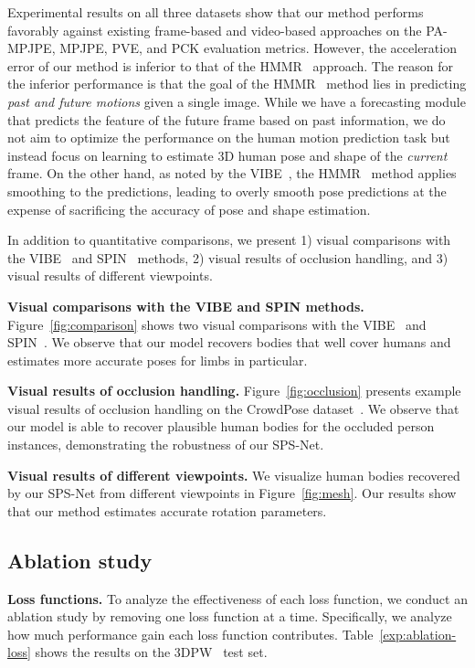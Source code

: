 \documentclass[times,referee,twocolumn,final,authoryear]{elsarticle}
\newcommand{\revised}[1]{{{#1}}}
\newcommand{\heading}[1]{\noindent\textbf{#1}}
\begin{document}
Experimental results on all three datasets show that our method performs favorably against existing frame-based and video-based approaches on the PA-MPJPE, MPJPE, PVE, and PCK evaluation metrics.
However, the acceleration error of our method is inferior to that of the HMMR~\citep{TemporalHMR} approach.
The reason for the inferior performance is that the goal of the HMMR~\citep{TemporalHMR} method lies in predicting \emph{past and future motions} given a single image.
While we have a forecasting module  that predicts the feature of the future frame based on past information, we do not aim to optimize the performance on the human motion prediction task but instead focus on learning to estimate 3D human pose and shape of the \emph{current} frame.
On the other hand, as noted by the VIBE~\citep{VIBE}, the HMMR~\citep{TemporalHMR} method applies smoothing to the predictions, leading to overly smooth pose predictions at the expense of sacrificing the accuracy of pose and shape estimation.

In addition to quantitative comparisons, we present 1) visual comparisons with the VIBE~\citep{VIBE} and SPIN~\citep{SPIN} methods, 2) visual results of occlusion handling, and 3) visual results of different viewpoints.

\heading{Visual comparisons with the VIBE and SPIN methods.}
Figure~\ref{fig:comparison} shows two visual comparisons with the VIBE~\citep{VIBE} and SPIN~\citep{SPIN}.
We observe that our model recovers bodies that well cover humans and estimates more accurate poses for limbs in particular.

\revised{
\heading{Visual results of occlusion handling.}
Figure~\ref{fig:occlusion} presents example visual results of occlusion handling on the CrowdPose dataset~\citep{li2019crowdpose}.
We observe that our model is able to recover plausible human bodies for the occluded person instances, demonstrating the robustness of our SPS-Net.
}

\heading{Visual results of different viewpoints.}
We visualize human bodies recovered by our SPS-Net from different viewpoints in Figure~\ref{fig:mesh}.
Our results show that our method estimates accurate rotation parameters.

\vspace{-3.0mm}  
\subsection{Ablation study}

\heading{Loss functions.}
To analyze the effectiveness of each loss function, we conduct an ablation study by removing one loss function at a time.
Specifically, we analyze how much performance gain each loss function contributes.
Table~\ref{exp:ablation-loss} shows the results on the 3DPW~\citep{3DPW} test set.
\end{document}

